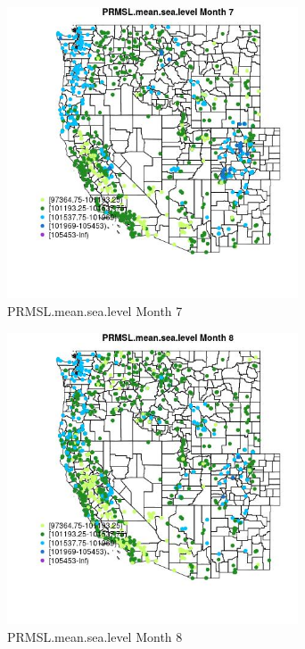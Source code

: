 \begin{figure} 
\centering  
\includegraphics[width=0.77\textwidth]{Code_Outputs/Report_ML_input_PM25_Step4_part_f_de_duplicated_aves_prioritize_24hr_obswNAs_MapObsMo7PRMSLmeansealevel.jpg} 
\caption{\label{fig:Report_ML_input_PM25_Step4_part_f_de_duplicated_aves_prioritize_24hr_obswNAsMapObsMo7PRMSLmeansealevel}PRMSL.mean.sea.level Month 7} 
\end{figure} 
 

\begin{figure} 
\centering  
\includegraphics[width=0.77\textwidth]{Code_Outputs/Report_ML_input_PM25_Step4_part_f_de_duplicated_aves_prioritize_24hr_obswNAs_MapObsMo8PRMSLmeansealevel.jpg} 
\caption{\label{fig:Report_ML_input_PM25_Step4_part_f_de_duplicated_aves_prioritize_24hr_obswNAsMapObsMo8PRMSLmeansealevel}PRMSL.mean.sea.level Month 8} 
\end{figure} 
 

